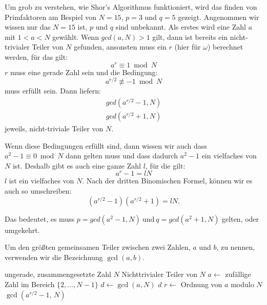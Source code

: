 Um grob zu verstehen, wie Shor's Algorithmus funktioniert, wird das finden von Primfaktoren am Bespiel von $N=15$, $p=3$ und $q=5$ gezeigt.
Angenommen wir wissen nur das $N=15$ ist, $p$ und $q$ sind unbekannt.
Als erstes wird eine Zahl $a$ mit $1<a<N$ gewählt. Wenn $gcd(a,N) > 1$ gilt, dann ist bereits ein nicht-trivialer Teiler von $N$ gefunden, ansonsten muss ein $r$ (hier für $\omega$) berechnet werden, für das gilt:
\begin{equation}
    a^r \equiv 1 \bmod N
\end{equation}
$r$ muss eine gerade Zahl sein und die Bedingung:
\begin{equation}
    a^{r/2} \not\equiv -1 \bmod N
\end{equation}
muss erfüllt sein.
Dann liefern:
\begin{align}
    gcd\left(a^{r/2}-1, N\right)\\
    gcd\left(a^{r/2}+1, N\right)
\end{align}
jeweils, nicht-triviale Teiler von $N$.

Wenn diese Bedingungen erfüllt sind, dann wissen wir auch dass $a^2-1 \equiv 0 \bmod N$ dann gelten muss und dass dadurch $a^2-1$ ein vielfaches von $N$ ist.
Deshalb gibt es auch eine ganze Zahl $l$, für die gilt:
\begin{equation}
    a^r-1 = lN
\end{equation}
$l$ ist ein vielfaches von $N$.
Nach der dritten Binomischen Formel, können wir es auch so umschreiben:
\begin{equation}
\left(a^{r/2}-1\right)\left(a^{r/2}+1\right)=lN.
\end{equation}

Das bedeutet, es muss $p=gcd(a^2-1, N)\ \text{und}\ q=gcd(a^2+1, N)$ gelten, oder umgekehrt.

Um den größten gemeinsamen Teiler zwischen zwei Zahlen, $a$ und $b$, zu nennen, verwenden wir die Bezeichnung $\gcd(a,b)$.
\begin{algorithm}[htbp]
\caption{shor's Algorithmus}
\label{alg:shors-algorithmus}
\begin{algorithmic}[1]
  \Require ungerade, zusammengesetzte Zahl $N$
  \Ensure Nichttrivialer Teiler von $N$
  \Repeat
    \State $a \gets$ zufällige Zahl im Bereich $\{2, \dots, N-1\}$
    \State $d \gets \gcd(a, N)$
     
      \State \Return $d$
    \EndIf
    \State $r \gets$ Ordnung von $a$ modulo $N$ 
      \State \Return $\gcd(a^{r/2} - 1,\, N)$
    \EndIf
\end{algorithmic}
\end{algorithm}

